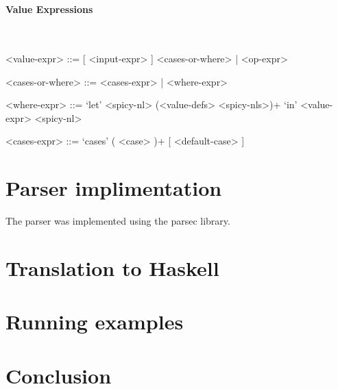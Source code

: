 \documentclass{article}
\def\H{Haskell}
\begin{document}
\hspace{1cm}\\

\paragraph{Value Expressions}

\hspace{1cm}\\
\begin{grammar}

<value-expr> ::= [ <input-expr> ] <cases-or-where> | <op-expr>

<cases-or-where> ::= <cases-expr> | <where-expr>

<where-expr> ::=
`let' <spicy-nl> (<value-defs> <spicy-nls>)+ `in' <value-expr> <spicy-nl>

<cases-expr> ::= `cases' ( <case> )+ [ <default-case> ]

\end{grammar}

\section{Parser implimentation}

The parser was implemented using the parsec library.

\section{Translation to \H}
\section{Running examples}
\section{Conclusion}

\hspace{1cm}\\

%
%
%
%

\end{document}
